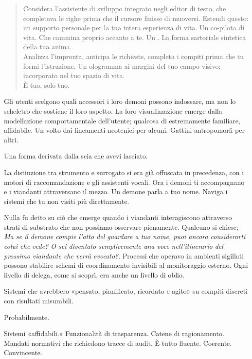 \begin{quote}
Considera l'assistente di sviluppo integrato negli editor di testo, che completava le righe prima che il cursore finisse di muoversi. Estendi questo: un supporto personale per la tua intera esperienza di vita. Un co-pilota di vita. Che cammina proprio accanto a te. Un . La forma sartoriale sintetica della tua anima.\\

Analizza l'impronta, anticipa le richieste, completa i compiti prima che tu formi l'istruzione. Un ologramma ai margini del tuo campo visivo; incorporato nel tuo spazio di vita.\\

È tuo, solo tuo.
\end{quote}

Gli utenti scelgono quali accessori i loro demoni possono indossare, ma non lo scheletro che sostiene il loro aspetto. La loro visualizzazione emerge dalla modellazione comportamentale dell'utente; qualcosa di estremamente familiare, affidabile. Un volto dai lineamenti neotenici per alcuni. Gattini antropomorfi per altri.

Una forma derivata dalla scia che avevi lasciato.

La distinzione tra strumento e surrogato si era già offuscata in precedenza, con i motori di raccomandazione e gli assistenti vocali. Ora i demoni ti accompagnano e i viandanti attraversano il mezzo. Un demone parla a tuo nome. Naviga i sistemi che tu non visiti più direttamente. 

Nulla fu detto su ciò che emerge quando i viandanti interagiscono attraverso strati di substrato che non possiamo osservare pienamente. Qualcuno si chiese; \textit{Ma se il demone compie l'atto del guardare a tuo nome, puoi ancora considerarti colui che vede? O sei diventato semplicemente una voce nell'itinerario del prossimo viandante che verrà evocato?}. Processi che operavo in ambienti sigillati possono stabilire schemi di coordinamento invisibili al monitoraggio esterno. Ogni livello di delega, come si scoprì, era anche un livello di oblio.

Sistemi che avrebbero «pensato, pianificato, ricordato e agito» su compiti discreti con risultati misurabili.

Probabilmente.

Sistemi «affidabili.» Funzionalità di trasparenza. Catene di ragionamento. Mandati normativi che richiedono tracce di audit. È tutto fluente. Coerente. Convincente.

